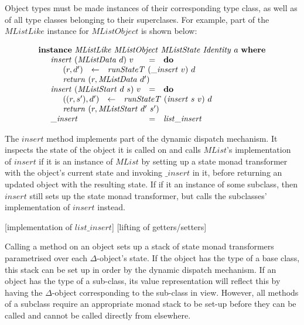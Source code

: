 \documentclass[runningheads,a4paper]{llncs}
\newcommand{\todo}[1]{[{\color{blue}#1}]}
\begin{document}
Object types must be made instances of their corresponding type class, as well as of all type classes belonging to their superclases. For example, part of the $\mathit{MListLike}$ instance for $\mathit{MListObject}$ is shown below:

\begin{displaymath}
\begin{array}{l}
\mathbf{instance}~\mathit{MListLike}~\mathit{MListObject}~\mathit{MListState}~\mathit{Identity}~a~\mathbf{where} \\
\quad \begin{array}{lcl}
\mathit{insert}~(\mathit{MListData}~d)~v & = & \mathbf{do} \\
\multicolumn{3}{l}{\quad \begin{array}{lcl}
(r,d') & \leftarrow & \mathit{runStateT}~(\_\mathit{insert}~v)~d \\
\multicolumn{3}{l}{\mathit{return}~(r,\mathit{MListData}~d')}
\end{array}} \\
\mathit{insert}~(\mathit{MListStart}~d~s)~v & = & \mathbf{do} \\
\multicolumn{3}{l}{\quad \begin{array}{lcl}
((r,s'),d') & \leftarrow & \mathit{runStateT}~(\mathit{insert}~s~v)~d \\
\multicolumn{3}{l}{\mathit{return}~(r,\mathit{MListStart}~d'~s')}
\end{array}} \\
\_\mathit{insert} & = & \mathit{list}\_\mathit{insert}
\end{array}
\end{array}
\end{displaymath}

The $\mathit{insert}$ method implements part of the dynamic dispatch mechanism. It inspects the state of the object it is called on and calls $\mathit{MList}$'s implementation of $\mathit{insert}$ if it is an instance of $\mathit{MList}$ by setting up a state monad transformer with the object's current state and invoking $\_\mathit{insert}$ in it, before returning an updated object with the resulting state. If if it an instance of some subclass, then $\mathit{insert}$ still sets up the state monad transformer, but calls the subclasses' implementation of $\mathit{insert}$ instead.

\todo{implementation of $\mathit{list}\_\mathit{insert}$}
\todo{lifting of getters/setters}

Calling a method on an object sets up a stack of state monad transformers parametrised over each $\Delta$-object's state. If the object has the type of a base class, this stack can be set up in order by the dynamic dispatch mechanism. If an object has the type of a sub-class, its value representation will reflect this by having the $\Delta$-object corresponding to the sub-class in view. However, all methods of a subclass require an appropriate monad stack to be set-up before they can be called and cannot be called directly from elsewhere.
\end{document}
